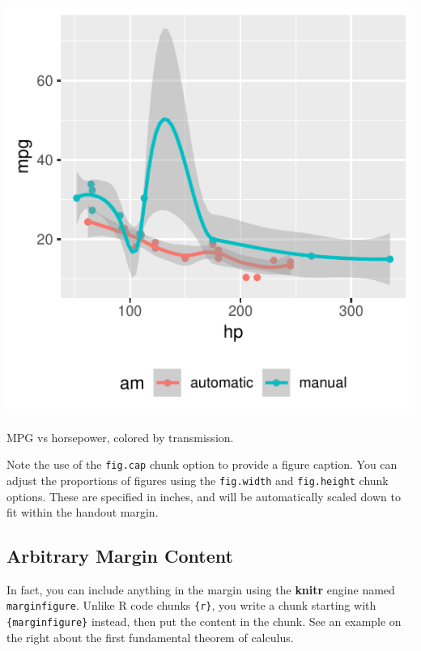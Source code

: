 \documentclass[]{tufte-handout}
\begin{document}
\begin{marginfigure}
\includegraphics{Epi_Notes_files/figure-latex/fig-margin-1} \caption[MPG vs horsepower, colored by transmission]{MPG vs horsepower, colored by transmission.}\label{fig:fig-margin}
\end{marginfigure}

Note the use of the \texttt{fig.cap} chunk option to provide a figure
caption. You can adjust the proportions of figures using the
\texttt{fig.width} and \texttt{fig.height} chunk options. These are
specified in inches, and will be automatically scaled down to fit within
the handout margin.

\hypertarget{arbitrary-margin-content}{%
\subsection{Arbitrary Margin Content}\label{arbitrary-margin-content}}

In fact, you can include anything in the margin using the \textbf{knitr}
engine named \texttt{marginfigure}. Unlike R code chunks
\texttt{\textasciigrave{}\textasciigrave{}\textasciigrave{}\{r\}}, you
write a chunk starting with
\texttt{\textasciigrave{}\textasciigrave{}\textasciigrave{}\{marginfigure\}}
instead, then put the content in the chunk. See an example on the right
about the first fundamental theorem of calculus.
\end{document}
